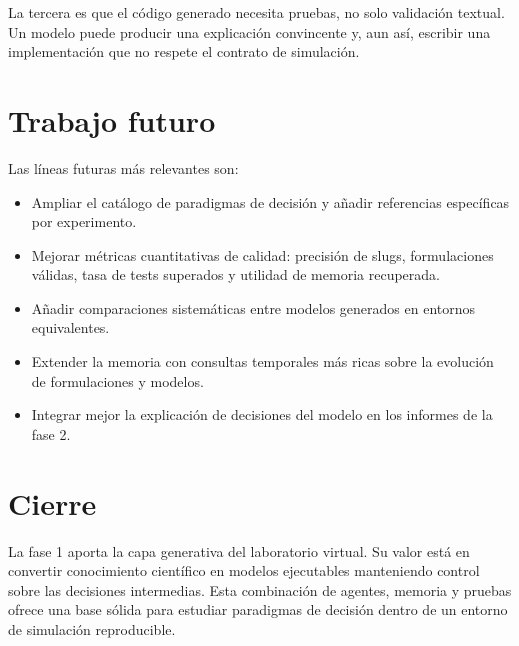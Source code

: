 La tercera es que el código generado necesita pruebas, no solo validación textual.
Un modelo puede producir una explicación convincente y, aun así, escribir una
implementación que no respete el contrato de simulación.

\section{Trabajo futuro}

Las líneas futuras más relevantes son:

\begin{itemize}
\item Ampliar el catálogo de paradigmas de decisión y añadir referencias
específicas por experimento.
\item Mejorar métricas cuantitativas de calidad: precisión de slugs,
formulaciones válidas, tasa de tests superados y utilidad de memoria recuperada.
\item Añadir comparaciones sistemáticas entre modelos generados en entornos
equivalentes.
\item Extender la memoria con consultas temporales más ricas sobre la evolución
de formulaciones y modelos.
\item Integrar mejor la explicación de decisiones del modelo en los informes de
la fase 2.
\end{itemize}

\section{Cierre}

La fase 1 aporta la capa generativa del laboratorio virtual. Su valor está en
convertir conocimiento científico en modelos ejecutables manteniendo control
sobre las decisiones intermedias. Esta combinación de agentes, memoria y pruebas
ofrece una base sólida para estudiar paradigmas de decisión dentro de un entorno
de simulación reproducible.
